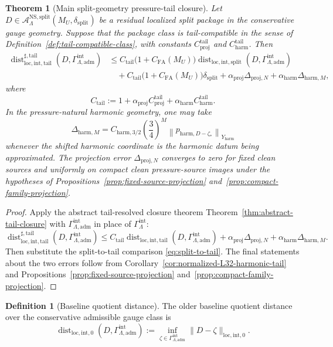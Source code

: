 \documentclass[11pt]{article}
\numberwithin{equation}{section}
\newtheorem{theorem}{Theorem}[section]
\theoremstyle{definition}
\newtheorem{definition}[definition]{Definition}
\theoremstyle{remark}
\DeclareMathOperator{\dist}{dist}
\newcommand{\NS}{\mathrm{NS}}
\newcommand{\loc}{\mathrm{loc}}
\newcommand{\intg}{\mathrm{int}}
\newcommand{\tail}{\mathrm{tail}}
\newcommand{\spl}{\mathrm{split}}
\newcommand{\adm}{\mathrm{adm}}
\newcommand{\proj}{\mathrm{proj}}
\newcommand{\harm}{\mathrm{harm}}
\newcommand{\norm}[2]{\left\|#1\right\|_{#2}}
\newcommand{\calA}{\mathcal A}
\newcommand{\Gammaint}{\Gamma^{\intg}_{\Lambda}}
\newcommand{\Gammaadm}{\Gamma^{\intg}_{\Lambda,\adm}}
\begin{document}
\begin{theorem}[Main split-geometry pressure-tail closure]\label{thm:main-split-closure}
Let $D\in\calA^{\NS,\spl}_{\Lambda}(M_U,\delta_{\spl})$ be a residual localized split
package in the conservative gauge geometry.  Suppose that the package class is tail-compatible
in the sense of Definition~\ref{def:tail-compatible-class}, with constants
$C^{\tail}_{\proj}$ and $C^{\tail}_{\harm}$.  Then
\begin{align}\label{eq:main-split-closure}
\dist^{\sharp,\tail}_{\loc,\intg,\tail}(D,\Gammaadm)
&\le
C_{\tail}\bigl(1+C_{\mathrm{FA}}(M_U)\bigr)
\dist_{\loc,\intg,\spl}(D,\Gammaadm)
\nonumber\\
&\quad+
C_{\tail}\bigl(1+C_{\mathrm{FA}}(M_U)\bigr)\delta_{\spl}
+
\alpha_{\proj}\Delta_{\proj,N}
+
\alpha_{\harm}\Delta_{\harm,M},
\end{align}
where
\[
        C_{\tail}:=1+
        \alpha_{\proj}C^{\tail}_{\proj}
        +\alpha_{\harm}C^{\tail}_{\harm}.
\]
In the pressure-natural harmonic geometry, one may take
\[
        \Delta_{\harm,M}=C_{\harm,3/2}\left(\frac34\right)^M
        \norm{p_{\harm,D-\zeta_*}}{Y_{\harm}}
\]
whenever the shifted harmonic coordinate is the harmonic datum being approximated.  The
projection error $\Delta_{\proj,N}$ converges to zero for fixed clean sources and uniformly
on compact clean pressure-source images under the hypotheses of
Propositions~\ref{prop:fixed-source-projection} and~\ref{prop:compact-family-projection}.
\end{theorem}

\begin{proof}
Apply the abstract tail-resolved closure theorem Theorem~\ref{thm:abstract-tail-closure} with
$\Gammaadm$ in place of $\Gammaint$:
\[
\dist^{\sharp,\tail}_{\loc,\intg,\tail}(D,\Gammaadm)
\le
C_{\tail}\dist_{\loc,\intg,\tail}(D,\Gammaadm)
+
\alpha_{\proj}\Delta_{\proj,N}
+
\alpha_{\harm}\Delta_{\harm,M}.
\]
Then substitute the split-to-tail comparison \eqref{eq:split-to-tail}.  The final statements
about the two errors follow from Corollary~\ref{cor:normalized-L32-harmonic-tail} and
Propositions~\ref{prop:fixed-source-projection} and~\ref{prop:compact-family-projection}.
\end{proof}

\begin{definition}[Baseline quotient distance]\label{def:baseline-distance}
The older baseline quotient distance over the conservative admissible gauge class is
\[
        \dist_{\loc,\intg,0}(D,\Gammaadm)
        :=
        \inf_{\zeta\in\Gammaadm}
        \|D-\zeta\|_{\loc,\intg,0}.
\]
\end{definition}
\end{document}
